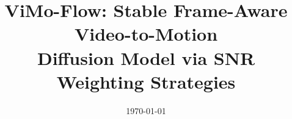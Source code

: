 \documentclass[MTech]{iittpdiss}
\begin{document}

\title{ViMo-Flow: Stable Frame-Aware Video-to-Motion \\Diffusion Model via SNR Weighting Strategies}


\date{\today}

\maketitle







\end{document}

